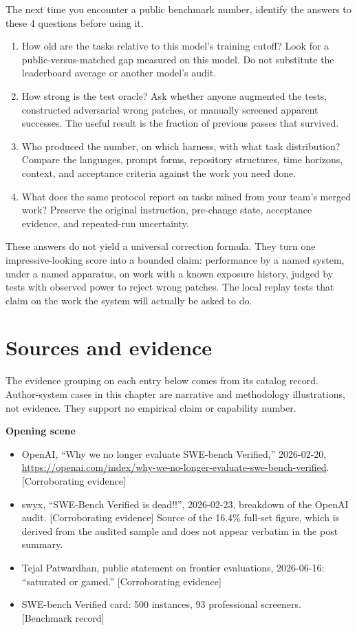 The next time you encounter a public benchmark number, identify the answers to these 4 questions before using it.

\begin{enumerate}
\def\labelenumi{\arabic{enumi}.}
\tightlist
\item
  How old are the tasks relative to this model's training cutoff? Look for a public-versus-matched gap measured on this model. Do not substitute the leaderboard average or another model's audit.
\item
  How strong is the test oracle? Ask whether anyone augmented the tests, constructed adversarial wrong patches, or manually screened apparent successes. The useful result is the fraction of previous passes that survived.
\item
  Who produced the number, on which harness, with what task distribution? Compare the languages, prompt forms, repository structures, time horizons, context, and acceptance criteria against the work you need done.
\item
  What does the same protocol report on tasks mined from your team's merged work? Preserve the original instruction, pre-change state, acceptance evidence, and repeated-run uncertainty.
\end{enumerate}

These answers do not yield a universal correction formula. They turn one impressive-looking score into a bounded claim: performance by a named system, under a named apparatus, on work with a known exposure history, judged by tests with observed power to reject wrong patches. The local replay tests that claim on the work the system will actually be asked to do.

\section*{Sources and evidence}

The evidence grouping on each entry below comes from its catalog record. Author-system cases in this chapter are narrative and methodology illustrations, not evidence. They support no empirical claim or capability number.

\textbf{Opening scene}

\begin{itemize}
\tightlist
\item
  OpenAI, ``Why we no longer evaluate SWE-bench Verified,'' 2026-02-20, \url{https://openai.com/index/why-we-no-longer-evaluate-swe-bench-verified}. {[}Corroborating evidence{]}
\item
  swyx, ``SWE-Bench Verified is dead!!'', 2026-02-23, breakdown of the OpenAI audit. {[}Corroborating evidence{]} Source of the 16.4\% full-set figure, which is derived from the audited sample and does not appear verbatim in the post summary.
\item
  Tejal Patwardhan, public statement on frontier evaluations, 2026-06-16: ``saturated or gamed.'' {[}Corroborating evidence{]}
\item
  SWE-bench Verified card: 500 instances, 93 professional screeners. {[}Benchmark record{]}
\end{itemize}

